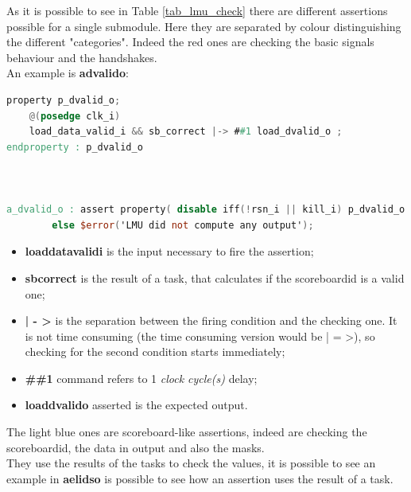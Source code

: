 As it is possible to see in Table \ref{tab_lmu_check} there are different assertions possible for a single submodule. 
Here they are separated by colour distinguishing the different "categories".
Indeed the red ones are checking the basic signals behaviour and the handshakes.\\
An example is \textbf{a\+dvalid\+o}:
\bigskip

\linespread{1}

\begin{lstlisting}[language=Verilog,style=verilog-style, backgroundcolor=\color{lyel_palette}, frame=tlb]
property p_dvalid_o;
	@(posedge clk_i)
	load_data_valid_i && sb_correct |-> ##1 load_dvalid_o ;
endproperty : p_dvalid_o



a_dvalid_o : assert property( disable iff(!rsn_i || kill_i) p_dvalid_o ) 
        else $error('LMU did not compute any output');

\end{lstlisting}
\linespread{1.2}
\bigskip
\begin{itemize}
    \item \textbf{load\+data\+valid\+i} is the input necessary to fire the assertion;
    
    \item \textbf{sb\+correct} is the result of a task, that calculates if the scoreboard\+id is a valid one;
    
    \item \textbf{| - >} is the separation between the firing condition and the checking one. It is not time consuming (the time consuming version would be | = >), so checking for the second condition starts immediately;
    
    \item \textbf{\#\#1} command refers to 1 \textit{clock cycle(s)} delay;
    
    \item \textbf{load\+dvalid\+o} asserted is the expected output.
\end{itemize}

The light blue ones are scoreboard-like assertions, indeed are checking the scoreboard\+id, the data in output and also the masks.\\
They use the results of the tasks to check the values, it is possible to see an example in \textbf{a\+el\+ids\+o} is possible to see how an assertion uses the result of a task.


